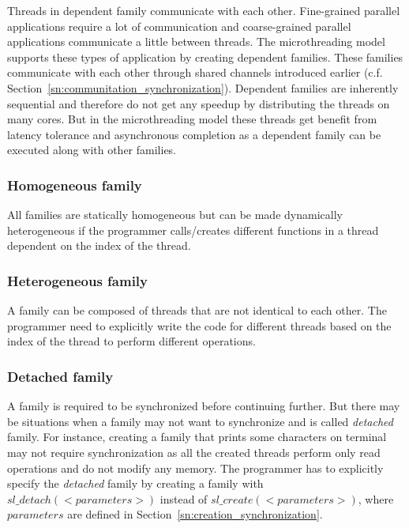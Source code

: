 \documentclass{article}
\begin{document}
Threads in dependent family communicate with each other. Fine-grained parallel
applications require a lot of communication and coarse-grained parallel
applications communicate a little between threads. The microthreading model
supports these types of application by creating dependent families. These
families communicate with each other through shared channels introduced earlier
(c.f. Section~\ref{sn:communitation_synchronization}). Dependent families are
inherently sequential and therefore do not get any speedup by distributing the
threads on many cores. But in the microthreading model these threads get
benefit from latency tolerance and asynchronous completion as a dependent
family can be executed along with other families. 

\subsubsection*{Homogeneous family}

All families are statically homogeneous but can be made dynamically
heterogeneous if the programmer calls/creates different functions in a thread
dependent on the index of the thread.

\subsubsection*{Heterogeneous family}

A family can be composed of threads that are not identical to each other. The
programmer need to explicitly write the code for different threads based on the
index of the thread to perform different operations. 

\subsubsection*{Detached family}

A family is required to be synchronized before continuing further. But there
may be situations when a family may not want to synchronize and is called
\emph{detached} family. For instance, creating a family that prints some
characters on terminal may not require synchronization as all the created
threads perform only read operations and do not modify any memory. The
programmer has to explicitly specify the \emph{detached} family by creating a
family with $sl\_detach(<parameters>)$ instead of $sl\_create(<parameters>)$,
where $parameters$ are defined in Section~\ref{sn:creation_synchronization}.
\end{document}
